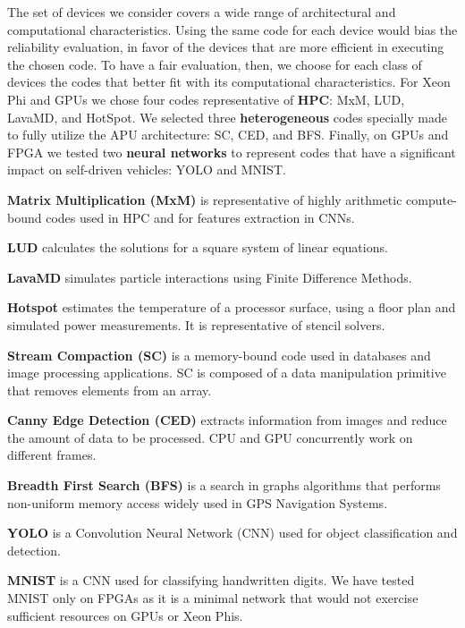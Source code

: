 The set of devices we consider covers a wide range of architectural and computational characteristics. Using the same code for each device would bias the reliability evaluation, in favor of the devices that are more efficient in executing the chosen code. 
To have a fair evaluation, then, we choose for each class of devices the codes that better fit with its computational characteristics. For Xeon Phi and GPUs we chose four codes representative of \textbf{HPC}: MxM, LUD, LavaMD, and HotSpot. We selected three \textbf{heterogeneous} codes specially made to fully utilize the APU architecture: SC, CED, and BFS. Finally, on GPUs and FPGA we tested two \textbf{neural networks} to represent codes that  have a significant impact on self-driven vehicles: YOLO and MNIST. 

\textbf{Matrix Multiplication (MxM)} is representative of highly arithmetic compute-bound codes used in HPC and for features extraction in CNNs. 

\textbf{LUD} calculates the solutions for a square system of linear equations.%

\textbf{LavaMD} simulates particle interactions using Finite Difference Methods. %

\textbf{Hotspot} estimates the temperature of a processor surface, using a floor plan and simulated power measurements. It is representative of stencil solvers. 

\textbf{Stream Compaction (SC)} is a memory-bound code used in databases and image processing applications. SC is composed of a data manipulation primitive that removes elements from an array.

\textbf{Canny Edge Detection (CED)} extracts information from images and reduce the amount of data to be processed. CPU and GPU concurrently work on different frames. %

\textbf{Breadth First Search (BFS)} is a search in graphs algorithms that performs non-uniform memory access widely used in GPS Navigation Systems. 

\textbf{YOLO} is a Convolution Neural Network (CNN) used for object classification and detection. 

\textbf{MNIST} is a CNN used for classifying handwritten digits. We have tested MNIST only on FPGAs as it is a minimal network that would not exercise sufficient resources on GPUs or Xeon Phis.


